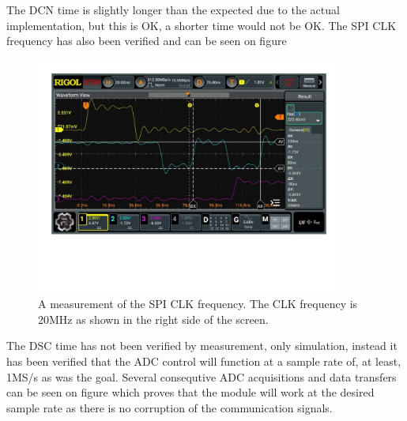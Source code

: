 The DCN time is slightly longer than the expected  due to the actual implementation, but this is OK, a shorter time would not be OK. The SPI CLK frequency has also been verified and can be seen on figure 

\begin{figure}[H]
    \centering
    \includegraphics[clip, trim=0 150 0 0, width=0.9\textwidth]{Sections/7_SystemDesign/Figures/7_2_8_ADC_CONTROL_SPICLK.pdf}
    \caption{A measurement of the SPI CLK frequency. The CLK frequency is 20MHz as shown in the right side of the screen.}
    \label{fig:7_2_8_ADC_CONTROL_SPI_CLK}
\end{figure}

The DSC time has not been verified by measurement, only simulation, instead it has been verified that the ADC control will function at a sample rate of, at least, 1MS/s as was the goal. Several consequtive ADC acquisitions and data transfers can be seen on figure  which proves that the module will work at the desired sample rate as there is no corruption of the communication signals.

